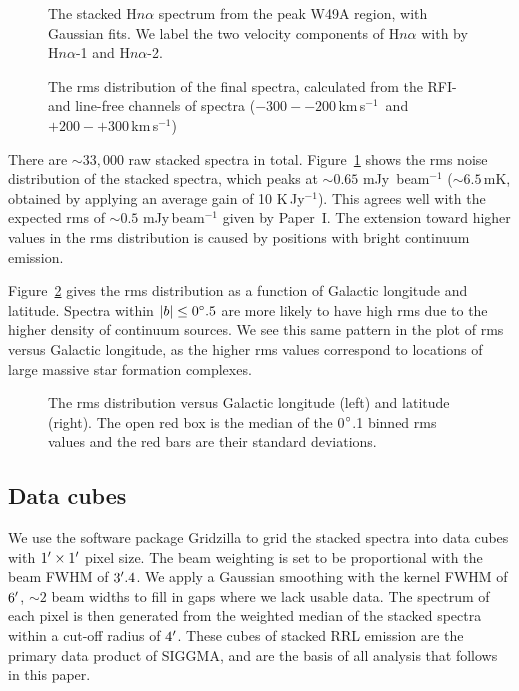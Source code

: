 \documentclass[manuscript]{aastex61}
\newcommand{\kms}{\,km\,s$^{-1}$}
\begin{document}
\begin{figure}%
\begin{minipage}{.48\textwidth}
\centering
{}
\caption{The stacked H$n\alpha$ spectrum from the peak W49A region, with Gaussian fits.
We label the two velocity components of H$n\alpha$ with by H$n\alpha$-1 and H$n\alpha$-2.
}\label{fig_spec}
\end{minipage}
\hfill
\begin{minipage}{.48\textwidth}
\centering
{}
\caption{The rms distribution of the final spectra, calculated from the RFI- and line-free channels of spectra ($-300 - -200$\kms\ and $+200 - +300$\kms)
}\label{fig_rms}
\end{minipage}
\end{figure}

There are $\sim33,000$ raw stacked spectra in total.
Figure~\ref{fig_rms} shows the rms noise distribution of the stacked spectra, which peaks at $\sim0.65$ mJy\, beam$^{-1}$ ($\sim6.5$\,mK, obtained by applying an average gain of 10 K\,Jy$^{-1}$). 
This agrees well with the expected rms of $\sim0.5$ mJy\,beam$^{-1}$ given by Paper~I. 
The extension toward higher values in the rms distribution is caused by positions with bright continuum emission.

Figure~\ref{fig_rms_glat} gives the rms distribution as a function of Galactic longitude and latitude.
Spectra within $|b| \leq 0\mbox{$^\circ$}.5$ are more likely to have high rms due to the higher density of continuum sources.
We see this same pattern in the plot of rms versus Galactic longitude, as the higher rms values correspond to locations of large massive star formation complexes.

\begin{figure}[htbp]
\caption{The rms distribution versus Galactic longitude (left) and latitude (right).
The open red box is the median of the 0$\mbox{$^\circ$}$.1 binned rms values and the red bars are their standard deviations.
}\label{fig_rms_glat}
\end{figure}

\subsection{Data cubes} \label{sec_cube}
We use the software package Gridzilla \citep{Barnes2001} to grid the stacked spectra into data cubes with $1\mbox{$^\prime$} \times 1\mbox{$^\prime$}$ pixel size.
The beam weighting is set to be proportional with the beam FWHM of $3\mbox{$^\prime$}.4$.
We apply a Gaussian smoothing with the kernel FWHM of $6\mbox{$^\prime$}$, $\sim2$ beam widths to fill in gaps where we lack usable data.
The spectrum of each pixel is then generated from the weighted median of the stacked spectra within a cut-off radius of $4\mbox{$^\prime$}$.
These cubes of stacked RRL emission are the primary data product of SIGGMA, and are the basis of all analysis that follows in this paper.
\end{document}
